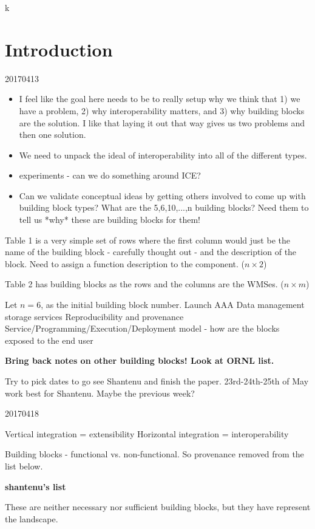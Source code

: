 k\section{Introduction}

20170413
\begin{itemize}
\item I feel like the goal here needs to be to really setup why we think that 1) we have a problem, 2) why interoperability matters, and 3) why building blocks are the solution. I like that laying it out that way gives us two problems and then one solution.
\item We need to unpack the ideal of interoperability into all of the different types.
\item experiments - can we do something around ICE?
\item Can we validate conceptual ideas by getting others involved to come up with building block types? What are the 5,6,10,...,n building blocks? Need them to tell us *why* these are building blocks for them!
\end{itemize}

Table 1 is a very simple set of rows where the first column would just be the name of the building block - carefully thought out - and the description of the block. Need to assign a function description to the component. ($n \times 2$)

Table 2 has building blocks as the rows and the columns are the WMSes. ($n \times m$)

Let $n = 6$, as the initial building block number.
Launch
AAA
Data management storage services
Reproducibility and provenance
Service/Programming/Execution/Deployment model - how are the blocks exposed to the end user

\textbf{Bring back notes on other building blocks! Look at ORNL list.}

Try to pick dates to go see Shantenu and finish the paper. 23rd-24th-25th of May work best for Shantenu. Maybe the previous week?

20170418

Vertical integration = extensibility
Horizontal integration = interoperability

Building blocks - functional vs. non-functional. So provenance removed from the list below.

{\bf shantenu's list}

These are neither necessary nor sufficient building blocks, but they have represent the landscape.


